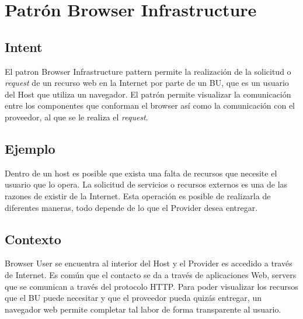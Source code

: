 \section{Patrón Browser Infrastructure}
\label{chap4:BrokerPatt}
\subsection{Intent}
El patron Browser Infrastructure pattern permite la realización de la solicitud o \textit{request} de un recurso web en la Internet por parte de un BU, que es un usuario del Host que utiliza un navegador. El patrón permite visualizar la comunicación entre los componentes que conforman el browser así como la comunicación con el proveedor, al que se le realiza el \textit{request}.

\subsection{Ejemplo}
Dentro de un host es posible que exista una falta de recursos que necesite el usuario que lo opera. La solicitud de servicios o recursos externos es una de las razones de existir de la Internet. Esta operación es posible de realizarla de diferentes maneras, todo depende de lo que el Provider desea entregar.

\subsection{Contexto}
Browser User se encuentra al interior del Host y el Provider es accedido a través de Internet.  Es común que el contacto se da a través de aplicaciones Web, servers que se comunican a través del protocolo HTTP. Para poder visualizar los recursos que el BU puede necesitar y que el proveedor pueda quizás entregar, un navegador web permite completar tal labor de forma transparente al usuario.
